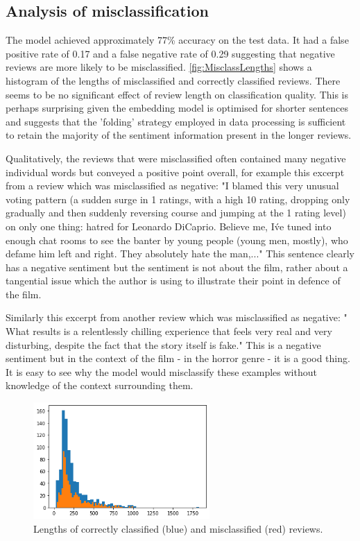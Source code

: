 \subsection{Analysis of misclassification}
The model achieved approximately 77\% accuracy on the test data. It had a false positive rate of 0.17 and a false negative rate of 0.29 suggesting that negative reviews are more likely to be misclassified. \autoref{fig:MisclassLengths} shows a histogram of the lengths of misclassified and correctly classified reviews. There seems to be no significant effect of review length on classification quality. This is perhaps surprising given the embedding model is optimised for shorter sentences and suggests that the 'folding' strategy employed in data processing is sufficient to retain the majority of the sentiment information present in the longer reviews.

Qualitatively, the reviews that were misclassified often contained many negative individual words but conveyed a positive point overall, for example this excerpt from a review which was misclassified as negative: "I blamed this very unusual voting pattern (a sudden surge in 1 ratings, with a high 10 rating, dropping only gradually and then suddenly reversing course and jumping at the 1 rating level) on only one thing: hatred for Leonardo DiCaprio. Believe me, I\'ve tuned into enough chat rooms to see the banter by young people (young men, mostly), who defame him left and right. They absolutely hate the man,..." This sentence clearly has a negative sentiment but the sentiment is not about the film, rather about a tangential issue which the author is using to illustrate their point in defence of the film.

Similarly this excerpt from another review which was misclassified as negative: " What results is a relentlessly chilling experience that feels very real and very disturbing, despite the fact that the story itself is fake." This is a negative sentiment but in the context of the film - in the horror genre - it is a good thing. It is easy to see why the model would misclassify these examples without knowledge of the context surrounding them.

\begin{figure}
    \centering
    \includegraphics[width= 0.6\textwidth]{figures/Misclass_Lenghts.png}
    \caption{Lengths of correctly classified (blue) and misclassified (red) reviews.}
    \label{fig:MisclassLengths}
\end{figure}